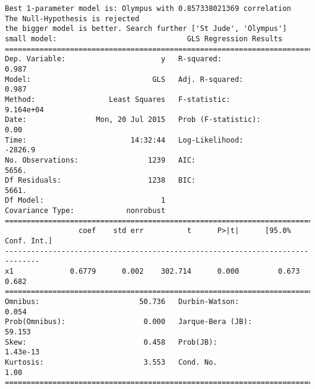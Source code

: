 \documentclass{article}
\begin{document}
\newpage
\begin{verbatim}
Best 1-parameter model is: Olympus with 0.857338021369 correlation
The Null-Hypothesis is rejected
the bigger model is better. Search further ['St Jude', 'Olympus']
small model:                              GLS Regression Results                            
==============================================================================
Dep. Variable:                      y   R-squared:                       0.987
Model:                            GLS   Adj. R-squared:                  0.987
Method:                 Least Squares   F-statistic:                 9.164e+04
Date:                Mon, 20 Jul 2015   Prob (F-statistic):               0.00
Time:                        14:32:44   Log-Likelihood:                -2826.9
No. Observations:                1239   AIC:                             5656.
Df Residuals:                    1238   BIC:                             5661.
Df Model:                           1                                         
Covariance Type:            nonrobust                                         
==============================================================================
                 coef    std err          t      P>|t|      [95.0% Conf. Int.]
------------------------------------------------------------------------------
x1             0.6779      0.002    302.714      0.000         0.673     0.682
==============================================================================
Omnibus:                       50.736   Durbin-Watson:                   0.054
Prob(Omnibus):                  0.000   Jarque-Bera (JB):               59.153
Skew:                           0.458   Prob(JB):                     1.43e-13
Kurtosis:                       3.553   Cond. No.                         1.00
==============================================================================


\end{verbatim}
\end{document}
